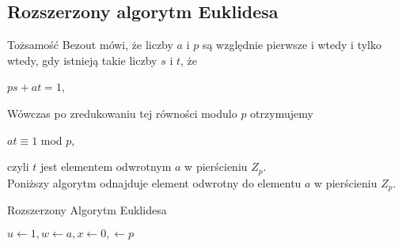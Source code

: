 \documentclass[]{article}
\begin{document}
	\subsection{Rozszerzony algorytm Euklidesa}
	
	Tożsamość Bezout mówi, że liczby $a$ i $p$ są względnie pierwsze i wtedy i tylko wtedy, gdy istnieją takie liczby $s$ i $t$, że
	
	\begin{center}
		$ps + at = 1$,
	\end{center}
	Wówczas po zredukowaniu tej równości modulo $p$ otrzymujemy
	\begin{center}
		$at \equiv 1$ mod $p$,
	\end{center}
	 czyli $t$ jest elementem odwrotnym $a$ w pierścieniu $Z_{p}$. \\
	
	Poniższy algorytm odnajduje element odwrotny do elementu $a$ w pierścieniu $Z_{p}$. \\
	
	\begin{algorithm}[H]
		\caption{Rozszerzony Algorytm Euklidesa}
		\BlankLine
		$u \leftarrow 1, w \leftarrow a, x \leftarrow 0, \leftarrow p$ \\
		
		
	\end{algorithm}
	
\end{document}
